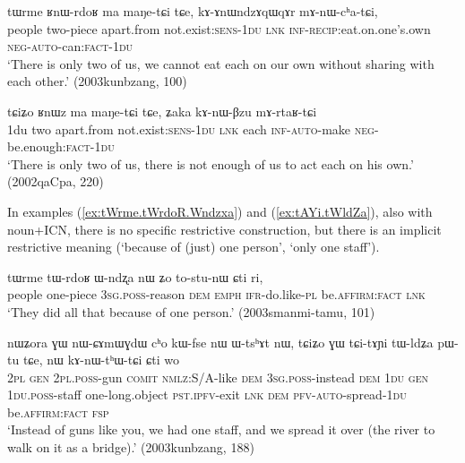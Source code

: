 \begin{exe}
\ex \label{ex:tWrme.tWrdoR.ma.maNetCi}
\gll tɯrme ʁnɯ-rdoʁ ma maŋe-tɕi tɕe, kɤ-ɤnɯndzɤqɯqɤr mɤ-nɯ-cʰa-tɕi, \\
people two-piece apart.from not.exist:\textsc{sens}-\textsc{1du} \textsc{lnk} \textsc{inf}-\textsc{recip}:eat.on.one's.own \textsc{neg}-\textsc{auto}-can:\textsc{fact}-\textsc{1du} \\
\glt `There is only two of us, we cannot eat each on our own without sharing with each other.' (2003kunbzang, 100)
\end{exe} 

\begin{exe}
\ex \label{ex:RnWz.ma.maNetCi}
\gll  tɕiʑo ʁnɯz ma maŋe-tɕi tɕe, ʑaka kɤ-nɯ-βzu mɤ-rtaʁ-tɕi \\
1du two apart.from not.exist:\textsc{sens}-\textsc{1du} \textsc{lnk} each \textsc{inf}-\textsc{auto}-make \textsc{neg}-be.enough:\textsc{fact}-\textsc{1du} \\
\glt  `There is only two of us, there is not enough of us to act each on his own.' (2002qaCpa, 220)
\end{exe} 

In examples (\ref{ex:tWrme.tWrdoR.Wndzxa}) and (\ref{ex:tAYi.tWldZa}), also with noun+ICN, there is no specific restrictive construction, but there is an implicit restrictive meaning (`because of (just) one person', `only one staff'). 

\begin{exe}
\ex \label{ex:tWrme.tWrdoR.Wndzxa}
\gll tɯrme tɯ-rdoʁ ɯ-ndʐa nɯ ʑo to-stu-nɯ ɕti ri, \\
people one-piece  \textsc{3sg}.\textsc{poss}-reason \textsc{dem} \textsc{emph} \textsc{ifr}-do.like-\textsc{pl} be.\textsc{affirm}:\textsc{fact} \textsc{lnk} \\
\glt `They did all that because of one person.' (2003smanmi-tamu, 101)
\end{exe} 

\begin{exe}
\ex \label{ex:tAYi.tWldZa}
\gll nɯʑora ɣɯ nɯ-ɕɤmɯɣdɯ cʰo kɯ-fse nɯ ɯ-tsʰɤt nɯ, tɕiʑo ɣɯ tɕi-tɤɲi tɯ-ldʑa pɯ-tu tɕe, nɯ kɤ-nɯ-tʰɯ-tɕi ɕti wo \\
\textsc{2pl} \textsc{gen} \textsc{2pl}.\textsc{poss}-gun \textsc{comit} \textsc{nmlz}:S/A-like \textsc{dem} \textsc{3sg}.\textsc{poss}-instead \textsc{dem}  \textsc{1du} \textsc{gen} \textsc{1du}.\textsc{poss}-staff one-long.object \textsc{pst}.\textsc{ipfv}-exit \textsc{lnk} \textsc{dem} \textsc{pfv}-\textsc{auto}-spread-\textsc{1du} be.\textsc{affirm}:\textsc{fact} \textsc{fsp} \\
\glt `Instead of guns like you, we had one staff, and we spread it over (the river to walk on it as a bridge).' (2003kunbzang, 188)
\end{exe} 

